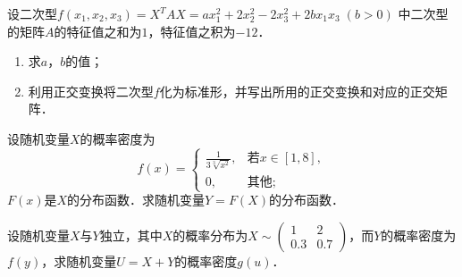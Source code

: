\documentclass[plain,noanswer,medmath]{../../template/jnuexam}
\begin{document}

\begin{problem}
设二次型$f(x_1,x_2,x_3) = X^T AX = ax_1^2 + 2x_2^2 - 2x_3^2 + 2bx_1x_3\;(b > 0)$
中二次型的矩阵$A$的特征值之和为$1$，特征值之积为$-12$．
\begin{enumerate}
\item 求$a$，$b$的值；
\item 利用正交变换将二次型$f$化为标准形，并写出所用的正交变换和对应的正交矩阵．
\end{enumerate}
\end{problem}



\begin{problem}
设随机变量$X$的概率密度为$$f(x) = \begin{cases}
  \frac{1}{3\sqrt[3]{x^2}}, & \text{若$x \in[1,8]$}, \\
                         0, & \text{其他};
\end{cases}$$
$F(x)$是$X$的分布函数．求随机变量$Y = F(X)$的分布函数．
\end{problem}



\begin{problem}
设随机变量$X$与$Y$独立，其中$X$的概率分布为$X\sim \begin{pmatrix}
    1 & 2 \\
  0.3 & 0.7
\end{pmatrix}$，而$Y$的概率密度为$f(y)$，求随机变量$U = X + Y$的概率密度$g(u)$．
\end{problem}
\end{document}
